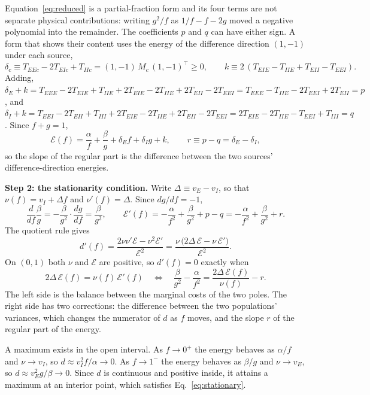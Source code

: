 \documentclass[11pt]{article}
\newcommand{\energy}{\mathcal E}
\begin{document}
Equation~\eqref{eq:reduced} is a partial-fraction form and its four terms are not separate physical contributions: writing $g^2/f$ as $1/f-f-2g$ moved a negative polynomial into the remainder. The coefficients $p$ and $q$ can have either sign. A form that shows their content uses the energy of the difference direction $(1,-1)$ under each source,
\[
 \delta_c\equiv T_{EEc}-2T_{EIc}+T_{IIc}=(1,-1)\,M_c\,(1,-1)^{\!\top}\ge0,\qquad
 k\equiv2\,(T_{EIE}-T_{IIE}+T_{EII}-T_{EEI}).
\]
Adding, $\delta_E+k=T_{EEE}-2T_{EIE}+T_{IIE}+2T_{EIE}-2T_{IIE}+2T_{EII}-2T_{EEI}=T_{EEE}-T_{IIE}-2T_{EEI}+2T_{EII}=p$, and $\delta_I+k=T_{EEI}-2T_{EII}+T_{III}+2T_{EIE}-2T_{IIE}+2T_{EII}-2T_{EEI}=2T_{EIE}-2T_{IIE}-T_{EEI}+T_{III}=q$. Since $f+g=1$,
\[
 \energy(f)=\frac{\alpha}{f}+\frac{\beta}{g}+\delta_Ef+\delta_Ig+k,
 \qquad r\equiv p-q=\delta_E-\delta_I ,
\]
so the slope of the regular part is the difference between the two sources' difference-direction energies.

\textbf{Step 2: the stationarity condition.} Write $\Delta\equiv v_E-v_I$, so that $\nu(f)=v_I+\Delta f$ and $\nu'(f)=\Delta$. Since $dg/df=-1$,
\[
 \frac{d}{df}\frac{\beta}{g}=-\frac{\beta}{g^2}\cdot\frac{dg}{df}=\frac{\beta}{g^2},
 \qquad
 \energy'(f)=-\frac{\alpha}{f^2}+\frac{\beta}{g^2}+p-q=-\frac{\alpha}{f^2}+\frac{\beta}{g^2}+r.
\]
The quotient rule gives
\[
 d'(f)=\frac{2\nu\nu'\energy-\nu^2\energy'}{\energy^2}
      =\frac{\nu\,\bigl(2\Delta\,\energy-\nu\,\energy'\bigr)}{\energy^2}.
\]
On $(0,1)$ both $\nu$ and $\energy$ are positive, so $d'(f)=0$ exactly when
\begin{equation}
 2\Delta\,\energy(f)=\nu(f)\,\energy'(f)
 \quad\Longleftrightarrow\quad
 \frac{\beta}{g^2}-\frac{\alpha}{f^2}=\frac{2\Delta\,\energy(f)}{\nu(f)}-r .
 \label{eq:stationary}
\end{equation}
The left side is the balance between the marginal costs of the two poles. The right side has two corrections: the difference between the two populations' variances, which changes the numerator of $d$ as $f$ moves, and the slope $r$ of the regular part of the energy.

A maximum exists in the open interval. As $f\to0^+$ the energy behaves as $\alpha/f$ and $\nu\to v_I$, so $d\approx v_I^2f/\alpha\to0$. As $f\to1^-$ the energy behaves as $\beta/g$ and $\nu\to v_E$, so $d\approx v_E^2g/\beta\to0$. Since $d$ is continuous and positive inside, it attains a maximum at an interior point, which satisfies Eq.~\eqref{eq:stationary}.
\end{document}
